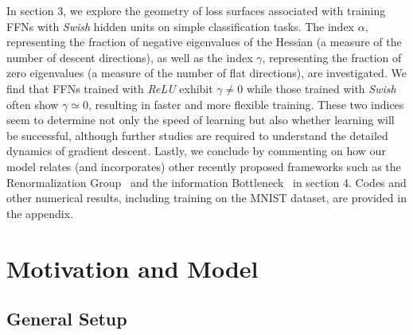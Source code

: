 \documentclass[5p]{elsarticle}
\begin{document}
In section 3, we explore the geometry of loss surfaces associated with training FFNs with {\it Swish} hidden units on simple classification tasks. The index $\alpha$, representing the fraction of negative eigenvalues of the Hessian (a measure of the number of descent directions), as well as the index $\gamma$, representing the fraction of zero eigenvalues (a measure of the number of flat directions), are investigated. We find that FFNs trained with {\it ReLU} exhibit $\gamma \neq 0$  while those trained with {\it Swish} often show $\gamma \simeq 0$, resulting in faster and more flexible training. These two indices seem to determine not only the speed of learning but also whether learning will be successful, although further studies are required to understand the detailed dynamics of gradient descent. Lastly, we conclude by commenting on how our model relates (and incorporates) other recently proposed frameworks such as the Renormalization Group~\cite{mehta} and the information Bottleneck~\cite{tishby1, tishby2} in section 4. Codes and other numerical results, including training on the MNIST dataset, are provided in the appendix.

%
\section{Motivation and Model} \label{sec:model}

\subsection{General Setup} \label{sub:setup}
\end{document}
